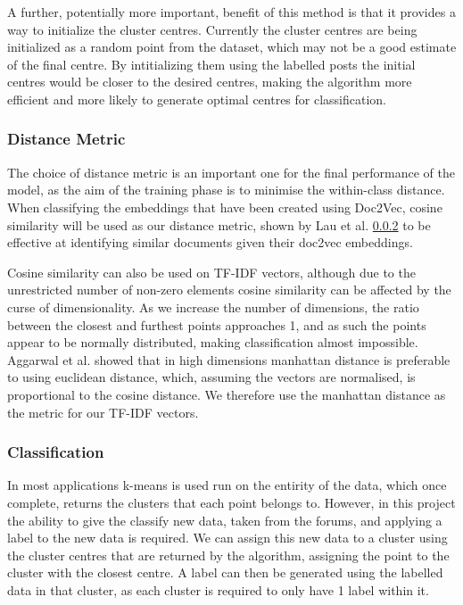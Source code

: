 \documentclass[12pt,a4paper,twoside,openright]{report}
\begin{document}
A further, potentially more important, benefit of this method is that it provides a way to initialize the cluster centres. Currently the cluster centres are being initialized as a random point from the dataset, which may not be a good estimate of the final centre. By intitializing them using the labelled posts the initial centres would be closer to the desired centres, making the algorithm more efficient and more likely to generate optimal centres for classification.

\subsubsection{Distance Metric}
The choice of distance metric is an important one for the final performance of the model, as the aim of the training phase is to minimise the within-class distance. When classifying the embeddings that have been created using Doc2Vec, cosine similarity will be used as our distance metric, shown by Lau et al. \ref{} to be effective at identifying similar documents given their doc2vec embeddings.


Cosine similarity can also be used on TF-IDF vectors, although due to the unrestricted number of non-zero elements cosine similarity can be affected by the curse of dimensionality. As we increase the number of dimensions, the ratio between the closest and furthest points approaches 1, and as such the points appear to be normally distributed, making classification almost impossible. Aggarwal et al. showed that in high dimensions manhattan distance is preferable to using euclidean distance, which, assuming the vectors are normalised, is proportional to the cosine distance. We therefore use the manhattan distance as the metric for our TF-IDF vectors.

\subsubsection{Classification}
In most applications k-means is used run on the entirity of the data, which once complete, returns the clusters that each point belongs to. However, in this project the ability to give the classify new data, taken from the forums, and applying a label to the new data is required. We can assign this new data to a cluster using the cluster centres that are returned by the algorithm, assigning the point to the cluster with the closest centre. A label can then be generated using the labelled data in that cluster, as each cluster is required to only have 1 label within it.
\end{document}
